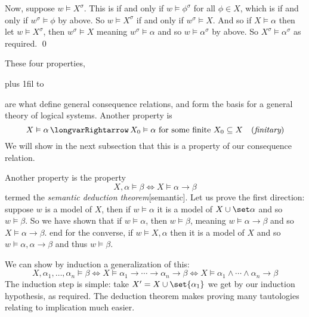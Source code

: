 Now, suppose $w\vDash X^\sigma$.
This is if and only if $w\vDash\phi^\sigma$ for all $\phi\in X$, which is if and only if $w^\sigma\vDash\phi$ by above.
So $w\vDash X^\sigma$ if and only if $w^\sigma\vDash X$.
And so if $X\vDash\alpha$ then let $w\vDash X^\sigma$, then $w^\sigma\vDash X$ meaning $w^\sigma\vDash\alpha$ and so $w\vDash\alpha^\sigma$ by above.
So $X^\sigma\vDash\alpha^\sigma$ as required.
\qed

These four properties,

\medskip
\tabskip=0pt plus 1fil
\halign to 
\medskip

are what define general consequence relations, and form the basis for a general theory of logical systems.
Another property is
$$ X\vDash\alpha \implies X_0\vDash\alpha\hbox{ for some finite $X_0\subseteq X$}\quad (\hbox{\it finitary}) $$
We will show in the next subsection that this is a property of our consequence relation.

Another property is the property
$$ X,\alpha\vDash\beta \iff X\vDash\alpha\to\beta $$
termed the {\it semantic deduction theorem}[semantic].
Let us prove the first direction: suppose $w$ is a model of $X$, then if $w\vDash\alpha$ it is a model of $X\cup\set\alpha$ and so $w\vDash\beta$.
So we have shown that if $w\vDash\alpha$, then $w\vDash\beta$, meaning $w\vDash\alpha\to\beta$ and so $X\vDash\alpha\to\beta$.
end for the converse, if $w\vDash X,\alpha$ then it is a model of $X$ and so $w\vDash\alpha,\alpha\to\beta$ and thus $w\vDash\beta$.

We can show by induction a generalization of this:
$$ X,\alpha_1,\dots,\alpha_n\vDash\beta \iff X\vDash\alpha_1\to\cdots\to\alpha_n\to\beta \iff X\vDash \alpha_1\land\cdots\land\alpha_n\to\beta $$
The induction step is simple: take $X'=X\cup\set{\alpha_1}$ we get by our induction hypothesis,
as required.
The deduction theorem makes proving many tautologies relating to implication much easier.

